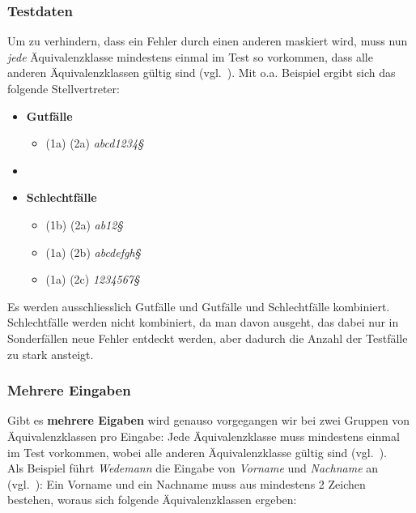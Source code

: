 \subsubsection*{Testdaten}
Um zu verhindern, dass ein Fehler durch einen anderen maskiert wird, muss nun \textit{jede} Äquivalenzklasse mindestens einmal im Test so vorkommen, dass alle anderen Äquivalenzklassen gültig sind (vgl.~\cite[44]{Wed09c}).
Mit o.a. Beispiel ergibt sich das folgende Stellvertreter:

\begin{itemize}
    \item \textbf{Gutfälle}
    \begin{itemize}
        \item[] (1a) (2a) \textit{abcd1234§}
    \end{itemize}
    \item \item \textbf{Schlechtfälle}
    \begin{itemize}
        \item[] (1b) (2a) \textit{ab12§}
        \item[] (1a) (2b) \textit{abcdefgh§}
        \item[] (1a) (2c) \textit{1234567§}
    \end{itemize}
\end{itemize}

\vspace{2mm}
\begin{tcolorbox}[colback=white]
    Es werden ausschliesslich Gutfälle und Gutfälle und Schlechtfälle kombiniert.
    Schlechtfälle werden nicht kombiniert, da man davon ausgeht, das dabei nur in Sonderfällen neue Fehler entdeckt werden, aber dadurch die Anzahl der Testfälle zu stark ansteigt.
\end{tcolorbox}
\vspace{2mm}

\subsubsection*{Mehrere Eingaben}
Gibt es \textbf{mehrere Eigaben} wird genauso vorgegangen wir bei zwei Gruppen von Äquivalenzklassen pro Eingabe: Jede Äquivalenzklasse muss mindestens einmal im Test vorkommen, wobei alle anderen Äquivalenzklasse gültig sind (vgl.~\cite[44]{Wed09c}).\\
Als Beispiel führt \textit{Wedemann} die Eingabe von \textit{Vorname} und \textit{Nachname} an (vgl.~\cite[44]{Wed09c}): Ein Vorname und ein Nachname muss aus mindestens 2 Zeichen bestehen, woraus sich folgende Äquivalenzklassen ergeben:

